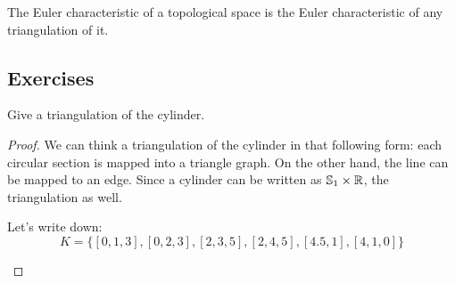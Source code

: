\begin{definition}
    The Euler characteristic of a topological space is the Euler
    characteristic of any triangulation of it.
\end{definition}

\subsection{Exercises}

\begin{exercise}
    Give a triangulation of the cylinder.
\end{exercise}

\begin{proof}

We can think a triangulation of the cylinder in that following form: each circular section is mapped
into a triangle graph. On the other hand, the line can be mapped to an edge.
Since a cylinder can be written as $\mathbb{S}_1 \times \mathbb{R}$, the triangulation
as well. 

Let's write
down: 
$$K = \{[0,1,3], [0,2,3], [2,3,5], [2,4,5],[4.5,1],[4,1,0]\}$$

\begin{figure}[H]
    \begin{center}

    \end{center}
\end{figure}

\end{proof}


